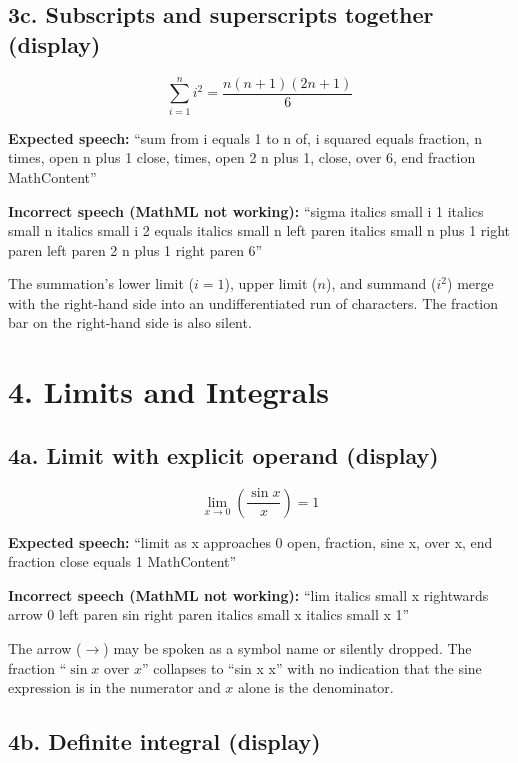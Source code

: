 \documentclass{article}
\newcommand{\limitof}[3]{\lim_{#1 \to #2}\!\left(#3\right)}
\begin{document}
\subsection*{3c. Subscripts and superscripts together (display)}

\[
  \sum_{i=1}^{n} i^2 = \frac{n(n+1)(2n+1)}{6}
\]

\textbf{Expected speech:} ``sum from i equals 1 to n of, i squared equals fraction, 
n times, open n plus 1 close, times, open 2 n plus 1, close, over 6, end fraction  
MathContent''

\textbf{Incorrect speech (MathML not working):} ``sigma italics small i 1 italics 
small n italics small i 2 equals italics small n left paren italics small n plus 
1 right paren left paren 2 n plus 1 right paren 6''

The summation's lower limit ($i=1$), upper limit ($n$),
and summand ($i^2$) merge with the right-hand side into an undifferentiated
run of characters. The fraction bar on the right-hand side is also silent.

\section*{4. Limits and Integrals}

\subsection*{4a. Limit with explicit operand (display)}

\[
  \limitof{x}{0}{\frac{\sin x}{x}} = 1
\]

\textbf{Expected speech:} ``limit as x approaches 0 open, fraction, sine x, 
over x, end fraction close equals 1 MathContent''

\textbf{Incorrect speech (MathML not working):} ``lim italics small x 
rightwards arrow 0 left paren sin right paren italics small x 
italics small x 1''

The arrow ($\to$) may be spoken as a symbol name or silently
dropped. The fraction ``$\sin x$ over $x$'' collapses to ``sin x x'' with
no indication that the sine expression is in the numerator and $x$ alone
is the denominator.

\subsection*{4b. Definite integral (display)}
\end{document}
